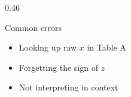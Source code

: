 \documentclass[aspectratio=169, 11pt]{beamer}
\begin{document}
{\begin{frame}[t, plain]
\begin{minipage}{0.9\textwidth}
\begin{columns}[T]
\begin{column}{0.46\textwidth}
        \vspace{0.5em}
        \begin{block}{Common errors}
          \small
          \begin{itemize}
            \setlength{\itemsep}{0.3em}
            \item Looking up raw $x$ in Table A
            \item Forgetting the sign of $z$
            \item Not interpreting in context
          \end{itemize}
        \end{block}
      \end{column}
    \end{columns}
  \end{minipage}
\end{frame}
}
\end{document}
